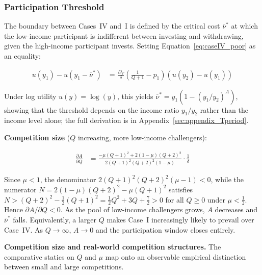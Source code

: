 \documentclass[
    oneside,
    fontsize=10pt,leqno]{article}
\begin{document}
\subsubsection{\label{subsec:Threshold}Participation Threshold}

The boundary between Cases~IV and~I is defined by the critical
cost $\overline{\nu}^{*}$ at which the low-income participant is indifferent
between investing and withdrawing, given the high-income participant invests.
Setting Equation~\ref{eq:caseIV_poor} as an equality:

\begin{align}
u(y_{1})-u(y_{1}-\overline{\nu}^{*}) & =\frac{D_{T}}{\delta}\left(\frac{1}{Q+1}-p_{1}\right)(u(y_{2})-u(y_{1}))\label{eq:threshold_general}
\end{align}

Under log utility $u(y)=\log(y)$, this yields
$\overline{\nu}^{*}=y_{1}(1-(y_{1}/y_{2})^{A})$, showing that the
threshold depends on the income ratio $y_{1}/y_{2}$ rather than the
income level alone; the full derivation is in
Appendix~\ref{sec:appendix_Tperiod}.


\medskip
\noindent\textbf{Competition size} ($Q$ increasing, more low-income challengers):

\begin{align}
\frac{\partial A}{\partial Q} & =\frac{-\mu(Q+1)^{2}+2(1-\mu)(Q+2)^{2}}{2(Q+1)^{2}(Q+2)^{2}(1-\mu)}\cdot\frac{1}{\delta}\label{eq:dA_dQ}
\end{align}

Since $\mu<1$, the denominator
$2(Q+1)^{2}(Q+2)^{2}(\mu-1)<0$, while the numerator
$N=2(1-\mu)(Q+2)^{2}-\mu(Q+1)^{2}$ satisfies $N>(Q+2)^{2}-\tfrac{1}{2}(Q+1)^{2}=\tfrac{1}{2}Q^{2}+3Q+\tfrac{7}{2}>0$
for all $Q\geq0$ under $\mu<\tfrac{1}{2}$. Hence $\partial A/\partial Q<0$.
As the pool of low-income challengers grows, $A$ decreases and
$\overline{\nu}^{*}$ falls. Equivalently, a larger $Q$ makes Case~I
increasingly likely to prevail over Case~IV. As $Q\to\infty$, $A\to0$
and the participation window closes entirely.

\medskip
\noindent\textbf{Competition size and real-world competition structures.}
The comparative statics on $Q$ and $\mu$ map onto an observable
empirical distinction between small and large competitions.
\end{document}
